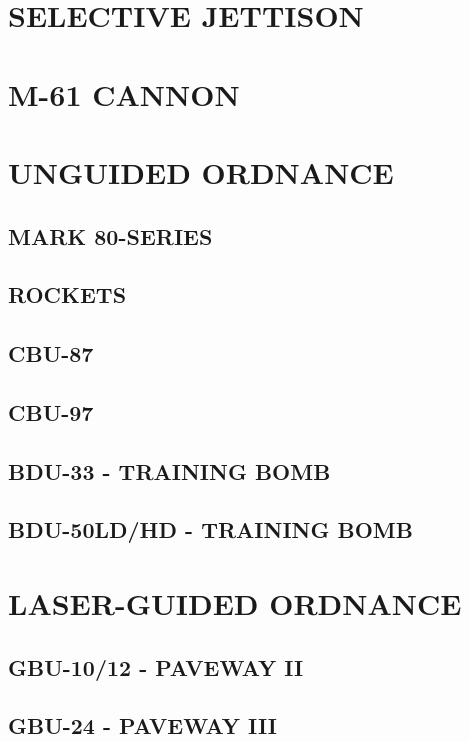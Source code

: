 \documentclass[fontInter]{TechCheck}
\begin{document}
	\section{SELECTIVE JETTISON}

	\clearpage

	\section{M-61 CANNON}

	\clearpage 

	\section{UNGUIDED ORDNANCE}
	
	\subsection{MARK 80-SERIES}
	\subsection{ROCKETS}
	\subsection{CBU-87}
	\subsection{CBU-97}
	\subsection{BDU-33 - TRAINING BOMB}
	\subsection{BDU-50LD/HD - TRAINING BOMB}

	\clearpage 

	\section{LASER-GUIDED ORDNANCE}

	\subsection{GBU-10/12 - PAVEWAY II}
	\subsection{GBU-24 - PAVEWAY III}
\end{document}
